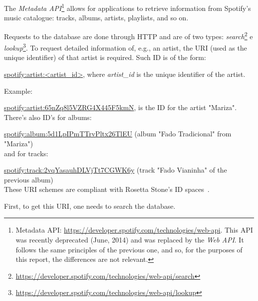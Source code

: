       The \emph{Metadata API}\footnote{Metadata API: \url{https://developer.spotify.com/technologies/web-api}. This API was recently deprecated (June, 2014) and was replaced by the \emph{Web API}. It follows the same principles of the previous one, and so, for the purposes of this report, the differences are not relevant.} allows for applications to retrieve information from Spotify's music catalogue: tracks, albums, artists, playlists, and so on.

      Requests to the database are done through HTTP and are of two types: \emph{search}\footnote{\url{https://developer.spotify.com/technologies/web-api/search}} e \emph{lookup}\footnote{\url{https://developer.spotify.com/technologies/web-api/lookup}}.
      To request detailed information of, e.g., an artist, the URI (used as the unique identifier) of that artist is required. Such ID is of the form:

      \url{spotify:artist:<artist_id>}, where \emph{artist\_id} is the unique identifier of the artist.

      Example:

      \url{spotify:artist:65nZq8l5VZRG4X445F5kmN}, is the ID for the artist "Mariza". \\

      There's also ID's for albums:

      \url{spotify:album:5d1LpIPmTTrvPltx26TlEU} (album "Fado Tradicional" from "Mariza") \\

       and for tracks:

       \url{spotify:track:2vqYasauhDLVjTt7CGWK6y} (track "Fado Vianinha" of the previous album) \\

      These URI schemes are compliant with Rosetta Stone's ID spaces~\cite{rosettastone}.

      First, to get this URI, one needs to search the database.

